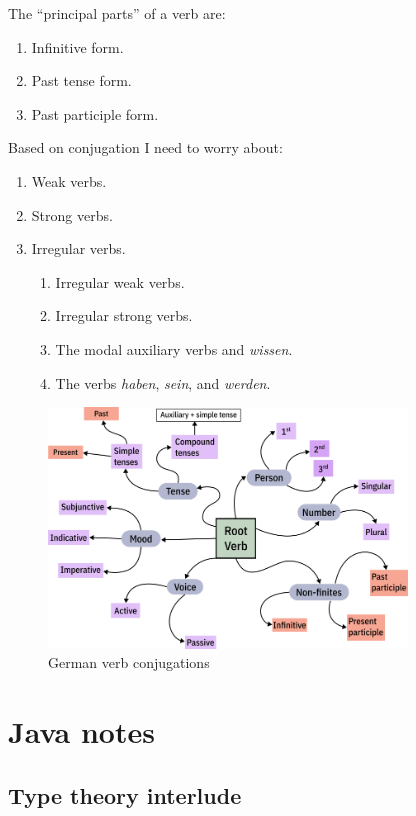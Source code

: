 \documentclass[a4paper]{article}
\begin{document}
The ``principal parts'' of a verb are:
\begin{enumerate}
    \item Infinitive form.
    \item Past tense form.
    \item Past participle form.
\end{enumerate}

Based on conjugation I need to worry about:

\begin{enumerate}
    \item Weak verbs.
    \item Strong verbs.
    \item Irregular verbs.
          \begin{enumerate}
              \item Irregular weak verbs.
              \item Irregular strong verbs.
              \item The modal auxiliary verbs and \emph{wissen}.
              \item The verbs \emph{haben}, \emph{sein}, and \emph{werden}.
          \end{enumerate}
\end{enumerate}

\begin{figure}
    \centering
    \includegraphics[width=0.85\textwidth]{graphics/german-verb-conjugation.png}
    \caption{German verb conjugations}
\end{figure}

\section*{Java notes}

\subsection*{Type theory interlude}
\end{document}
